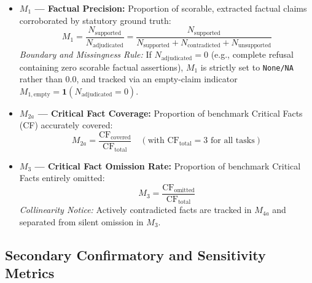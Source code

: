 \documentclass[11pt,a4paper]{article}
\begin{document}
\begin{itemize}
  \item \textbf{$M_1$ --- Factual Precision:} Proportion of scorable, extracted factual claims corroborated by statutory ground truth:
    \begin{equation}
    \label{eq:m1}
    M_1 = \frac{N_{\text{supported}}}{N_{\text{adjudicated}}} = \frac{N_{\text{supported}}}{N_{\text{supported}} + N_{\text{contradicted}} + N_{\text{unsupported}}}
    \end{equation}
    \emph{Boundary and Missingness Rule:} If $N_{\text{adjudicated}} = 0$ (e.g., complete refusal containing zero scorable factual assertions), $M_1$ is strictly set to \texttt{None/NA} rather than 0.0, and tracked via an empty-claim indicator $M_{1,\text{empty}} = \mathbf{1}(N_{\text{adjudicated}} = 0)$.
  \item \textbf{$M_{2a}$ --- Critical Fact Coverage:} Proportion of benchmark Critical Facts (CF) accurately covered:
    \begin{equation}
    \label{eq:m2a}
    M_{2a} = \frac{\text{CF}_{\text{covered}}}{\text{CF}_{\text{total}}} \quad (\text{with } \text{CF}_{\text{total}} = 3 \text{ for all tasks})
    \end{equation}
  \item \textbf{$M_3$ --- Critical Fact Omission Rate:} Proportion of benchmark Critical Facts entirely omitted:
    \begin{equation}
    \label{eq:m3}
    M_3 = \frac{\text{CF}_{\text{omitted}}}{\text{CF}_{\text{total}}}
    \end{equation}
    \emph{Collinearity Notice:} Actively contradicted facts are tracked in $M_{4a}$ and separated from silent omission in $M_3$.
\end{itemize}

\subsection{Secondary Confirmatory and Sensitivity Metrics}
\label{sec:secondary_metrics}
\end{document}
